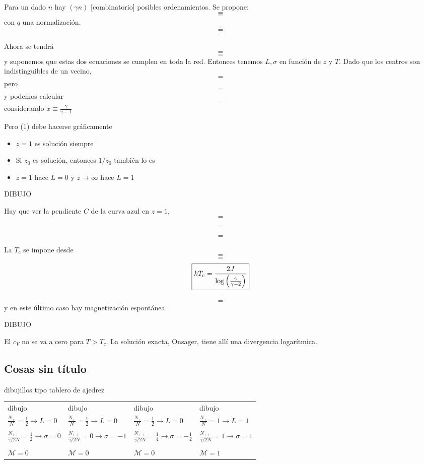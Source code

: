 \documentclass[10pt,oneside]{CBFT_book}
\begin{document}
Para un dado $n$ hay $(\gamma n)$ [combinatorio] posibles ordenamientos.
Se propone:
\[=\]
\[=\]
con $q$ una normalización.
\[=\]
\[=\]
\[=\]

Ahora se tendrá
\[=\]
\[=\]
y suponemos que estas dos ecuaciones se cumplen en toda la red.
Entonces tenemos $L,\sigma$ en función de $z$ y $T$.
Dado que los centros son indistinguibles de un vecino,
\[=\]
pero
\[=\]
y podemos calcular
\[=\]
considerando $x\equiv \frac{\gamma}{\gamma -1}$

Pero (1) debe hacerse gráficamente
\begin{itemize}
 \item $z=1$ es solución siempre 
 \item Si $z_0$ es solución, entonces $1/z_0$ también lo es
 \item $z=1$ hace $L=0$ y $z\to\infty$ hace $L=1$
\end{itemize}

DIBUJO

Hay que ver la pendiente $C$ de la curva azul en $z=1$,
\[=\]

\[=\]

\[=\]

La $T_c$ se impone desde
\[=\]
\[=\]
\[ 
	\boxed{ kT_c = \frac{2J}{\log \left( \frac{ \gamma }{ \gamma -2  } \right) }}
\]

\[=\]
\[=\]
y en este último caso hay magnetización espontánea.

DIBUJO

El $c_V$ no se va a cero para $T>T_c$.
La solución exacta, Onsager, tiene allí una divergencia logarítmica.

\subsection{Cosas sin título}

dibujillos tipo tablero de ajedrez

\begin{center}
\begin{tabular}{l|l|l|l}
dibujo & dibujo & dibujo & dibujo \\
$ \displaystyle \frac{N_+}{N} =\frac{1}{2} \to L=0 $ & $ \displaystyle \frac{N_+}{N} =\frac{1}{2} \to L=0 $ & 
$ \displaystyle \frac{N_+}{N} =\frac{1}{2} \to L=0 $ & $ \displaystyle \frac{N_+}{N} =1 \to L=1 $ \\
 & & & \\
$ \displaystyle \frac{N_{++}}{\gamma/2 N} =\frac{1}{2} \to \sigma=0 $ & 
$ \displaystyle \frac{N_{++}}{\gamma/2 N} = 0 \to \sigma=-1 $ & 
$ \displaystyle \frac{N_{++}}{\gamma/2 N} =\frac{1}{4} \to \sigma=-\frac{1}{2} $ & 
$\displaystyle \frac{N_{++}}{\gamma/2 N} = 1 \to \sigma=1$ \\
 & & & \\
$\mathcal{M}=0$ & $\mathcal{M}=0$ & $\mathcal{M}=0$ & $\mathcal{M}=1$
\end{tabular}
\end{center}
\end{document}

